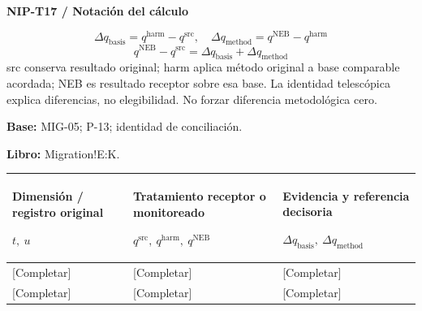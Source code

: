 \Needspace{112mm}
\par\begingroup\sffamily\fontsize{8}{10}\selectfont\color{NEBGreen}\setlength{\parskip}{2pt}\setlength{\abovedisplayskip}{4pt}\setlength{\belowdisplayskip}{4pt}\setlength{\abovedisplayshortskip}{2pt}\setlength{\belowdisplayshortskip}{3pt}
\textbf{NIP-T17 / Notación del cálculo}\par
{\fontsize{9}{11}\selectfont\[ \Delta q_{\mathrm{basis}}=q^{\mathrm{harm}}-q^{\mathrm{src}},\quad \Delta q_{\mathrm{method}}=q^{\mathrm{NEB}}-q^{\mathrm{harm}} \]}
{\fontsize{9}{11}\selectfont\[ q^{\mathrm{NEB}}-q^{\mathrm{src}}=\Delta q_{\mathrm{basis}}+\Delta q_{\mathrm{method}} \]}
src conserva resultado original; harm aplica método original a base comparable acordada; NEB es resultado receptor sobre esa base. La identidad telescópica explica diferencias, no elegibilidad. No forzar diferencia metodológica cero.\par
\textbf{Base:} MIG-05; P-13; identidad de conciliación.\par
\textbf{Libro:} Migration!E:K.\par\endgroup
{\sffamily\fontsize{8.3}{10.3}\selectfont\begin{longtable}{@{}P{54.83mm} P{54.83mm} P{54.83mm}@{}}
\toprule
\textbf{Dimensión / registro original}\par {\normalfont\fontsize{8.2}{10}\selectfont $t,\ u$} & \textbf{Tratamiento receptor o monitoreado}\par {\normalfont\fontsize{8.2}{10}\selectfont $q^{\mathrm{src}},\ q^{\mathrm{harm}},\ q^{\mathrm{NEB}}$} & \textbf{Evidencia y referencia decisoria}\par {\normalfont\fontsize{8.2}{10}\selectfont $\Delta q_{\mathrm{basis}},\ \Delta q_{\mathrm{method}}$}\\\midrule\endhead
\rule{0pt}{8mm}[Completar] & [Completar] & [Completar]\\\hline
\rule{0pt}{8mm}[Completar] & [Completar] & [Completar]\\\hline
\end{longtable}}

